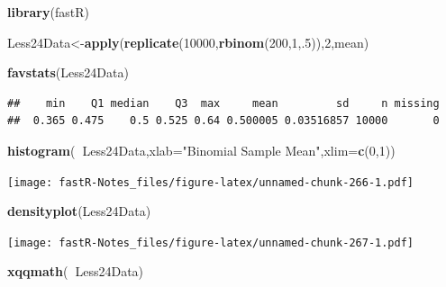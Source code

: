 \documentclass[]{book}
\newenvironment{Shaded}{\begin{snugshade}}{\end{snugshade}}
\newcommand{\KeywordTok}[1]{\textcolor[rgb]{0.13,0.29,0.53}{\textbf{#1}}}
\newcommand{\DataTypeTok}[1]{\textcolor[rgb]{0.13,0.29,0.53}{#1}}
\newcommand{\DecValTok}[1]{\textcolor[rgb]{0.00,0.00,0.81}{#1}}
\newcommand{\StringTok}[1]{\textcolor[rgb]{0.31,0.60,0.02}{#1}}
\newcommand{\OperatorTok}[1]{\textcolor[rgb]{0.81,0.36,0.00}{\textbf{#1}}}
\newcommand{\NormalTok}[1]{#1}
\theoremstyle{definition}
\theoremstyle{definition}
\theoremstyle{definition}
\theoremstyle{remark}
\begin{document}
\begin{Shaded}
\begin{Highlighting}[]
\KeywordTok{library}\NormalTok{(fastR)}
\end{Highlighting}
\end{Shaded}

\begin{Shaded}
\begin{Highlighting}[]
\NormalTok{Less24Data<-}\KeywordTok{apply}\NormalTok{(}\KeywordTok{replicate}\NormalTok{(}\DecValTok{10000}\NormalTok{,}\KeywordTok{rbinom}\NormalTok{(}\DecValTok{200}\NormalTok{,}\DecValTok{1}\NormalTok{,.}\DecValTok{5}\NormalTok{)),}\DecValTok{2}\NormalTok{,mean)}
\end{Highlighting}
\end{Shaded}

\begin{Shaded}
\begin{Highlighting}[]
\KeywordTok{favstats}\NormalTok{(Less24Data)}
\end{Highlighting}
\end{Shaded}

\begin{verbatim}
##    min    Q1 median    Q3  max     mean         sd     n missing
##  0.365 0.475    0.5 0.525 0.64 0.500005 0.03516857 10000       0
\end{verbatim}

\begin{Shaded}
\begin{Highlighting}[]
\KeywordTok{histogram}\NormalTok{(}\OperatorTok{~}\NormalTok{Less24Data,}\DataTypeTok{xlab=}\StringTok{"Binomial Sample Mean"}\NormalTok{,}\DataTypeTok{xlim=}\KeywordTok{c}\NormalTok{(}\DecValTok{0}\NormalTok{,}\DecValTok{1}\NormalTok{))}
\end{Highlighting}
\end{Shaded}

\texttt{[image: fastR-Notes\_files/figure-latex/unnamed-chunk-266-1.pdf]}

\begin{Shaded}
\begin{Highlighting}[]
\KeywordTok{densityplot}\NormalTok{(Less24Data)}
\end{Highlighting}
\end{Shaded}

\texttt{[image: fastR-Notes\_files/figure-latex/unnamed-chunk-267-1.pdf]}

\begin{Shaded}
\begin{Highlighting}[]
\KeywordTok{xqqmath}\NormalTok{(}\OperatorTok{~}\NormalTok{Less24Data)}
\end{Highlighting}
\end{Shaded}
\end{document}
